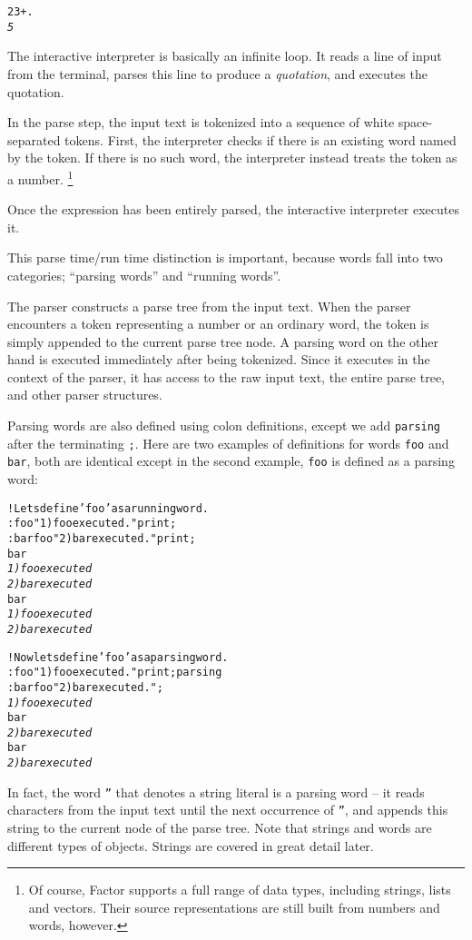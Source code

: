 \documentclass[english]{article}
\begin{document}
\begin{alltt}
2 3 + .
\emph{5}
\end{alltt}
The interactive interpreter is basically an infinite loop. It reads
a line of input from the terminal, parses this line to produce a \emph{quotation},
and executes the quotation.

In the parse step, the input text is tokenized into a sequence of
white space-separated tokens. First, the interpreter checks if there
is an existing word named by the token. If there is no such word,
the interpreter instead treats the token as a number.%
\footnote{Of course, Factor supports a full range of data types, including strings,
lists and vectors. Their source representations are still built from
numbers and words, however.%
}

Once the expression has been entirely parsed, the interactive interpreter
executes it.

This parse time/run time distinction is important, because words fall
into two categories; {}``parsing words'' and {}``running words''.

The parser constructs a parse tree from the input text. When the parser
encounters a token representing a number or an ordinary word, the
token is simply appended to the current parse tree node. A parsing
word on the other hand is executed \emph{}immediately after being
tokenized. Since it executes in the context of the parser, it has
access to the raw input text, the entire parse tree, and other parser
structures.

Parsing words are also defined using colon definitions, except we
add \texttt{parsing} after the terminating \texttt{;}. Here are two
examples of definitions for words \texttt{foo} and \texttt{bar}, both
are identical except in the second example, \texttt{foo} is defined
as a parsing word:

\begin{alltt}
! Lets define 'foo' as a running word.
: foo "1) foo executed." print ;
: bar foo "2) bar executed." print ;
bar
\emph{1) foo executed}
\emph{2) bar executed}
bar
\emph{1) foo executed}
\emph{2) bar executed}

! Now lets define 'foo' as a parsing word.
: foo "1) foo executed." print ; parsing
: bar foo "2) bar executed." ;
\emph{1) foo executed}
bar
\emph{2) bar executed}
bar
\emph{2) bar executed}
\end{alltt}
In fact, the word \texttt{{}''} that denotes a string literal is
a parsing word -- it reads characters from the input text until the
next occurrence of \texttt{{}''}, and appends this string to the
current node of the parse tree. Note that strings and words are different
types of objects. Strings are covered in great detail later.
\end{document}
